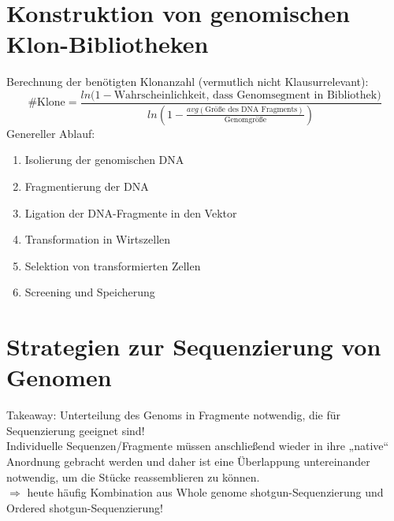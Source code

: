 \section{Konstruktion von genomischen Klon-Bibliotheken} 
Berechnung der benötigten Klonanzahl (vermutlich nicht Klausurrelevant): \begin{equation*}
    \#\text{Klone} = 
    \frac{
    ln(1-\text{Wahrscheinlichkeit, dass Genomsegment in Bibliothek)}
    }
    {ln(1- 
    \frac{
    avg(\text{Größe des DNA Fragments})
    }{
    \text{Genomgröße}
    } )}
\end{equation*}
Genereller Ablauf: 
\begin{enumerate}
    \item Isolierung der genomischen DNA
    \item Fragmentierung der DNA
    \item Ligation der DNA-Fragmente in den Vektor
    \item Transformation in Wirtszellen
    \item Selektion von transformierten Zellen
    \item Screening und Speicherung
\end{enumerate}
\section{Strategien zur Sequenzierung von Genomen} 
Takeaway: Unterteilung des Genoms in Fragmente notwendig, die für Sequenzierung geeignet sind! \\ \newline 
Individuelle Sequenzen/Fragmente müssen anschließend wieder in ihre „native“ Anordnung gebracht werden und daher ist eine Überlappung untereinander notwendig, um die Stücke reassemblieren zu können. \\ \newline
$\Rightarrow$ heute häufig Kombination aus Whole genome shotgun-Sequenzierung und Ordered shotgun-Sequenzierung!

